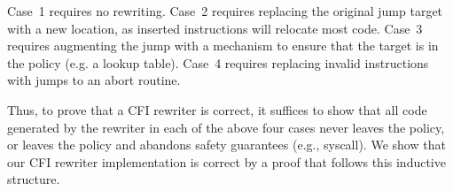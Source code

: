 Case~1 requires no rewriting.
Case~2 requires replacing the original jump target with a new location, as inserted instructions will relocate most code.
Case~3 requires augmenting the jump with a mechanism to ensure that the target is in the policy (e.g. a lookup table).
Case~4 requires replacing invalid instructions with jumps to an abort routine.

Thus, to prove that a CFI rewriter is correct, it suffices to show that all code generated by the rewriter in each of the above four cases never leaves the policy, or leaves the policy and abandons safety guarantees (e.g., syscall).
We show that our CFI rewriter implementation is correct by a proof that follows this inductive structure.

